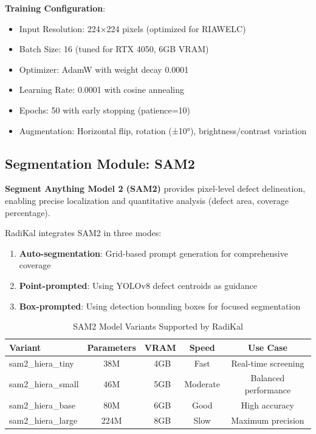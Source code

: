 \documentclass[12pt,a4paper]{report}
\begin{document}
\textbf{Training Configuration}:
\begin{itemize}
    \item Input Resolution: 224×224 pixels (optimized for RIAWELC)
    \item Batch Size: 16 (tuned for RTX 4050, 6GB VRAM)
    \item Optimizer: AdamW with weight decay 0.0001
    \item Learning Rate: 0.0001 with cosine annealing
    \item Epochs: 50 with early stopping (patience=10)
    \item Augmentation: Horizontal flip, rotation (±10°), brightness/contrast variation
\end{itemize}

\subsection{Segmentation Module: SAM2}

\textbf{Segment Anything Model 2 (SAM2)} provides pixel-level defect delineation, enabling precise localization and quantitative analysis (defect area, coverage percentage).

RadiKal integrates SAM2 in three modes:
\begin{enumerate}
    \item \textbf{Auto-segmentation}: Grid-based prompt generation for comprehensive coverage
    \item \textbf{Point-prompted}: Using YOLOv8 defect centroids as guidance
    \item \textbf{Box-prompted}: Using detection bounding boxes for focused segmentation
\end{enumerate}

\begin{table}[H]
\centering
\caption{SAM2 Model Variants Supported by RadiKal}
\label{tab:sam2_variants}
\begin{tabular}{lcccc}
\toprule
\textbf{Variant} & \textbf{Parameters} & \textbf{VRAM} & \textbf{Speed} & \textbf{Use Case} \\
\midrule
sam2\_hiera\_tiny & 38M & ~4GB & Fast & Real-time screening \\
sam2\_hiera\_small & 46M & ~5GB & Moderate & Balanced performance \\
sam2\_hiera\_base & 80M & ~6GB & Good & High accuracy \\
sam2\_hiera\_large & 224M & ~8GB & Slow & Maximum precision \\
\bottomrule
\end{tabular}
\end{table}
\end{document}
